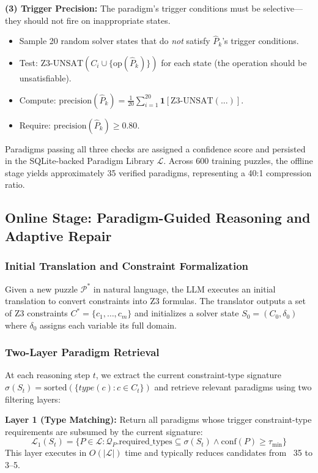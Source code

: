 \textbf{(3) Trigger Precision:} The paradigm's trigger conditions must be selective—they should not fire on inappropriate states.
\begin{itemize}
    \item Sample 20 random solver states that do \textit{not} satisfy $\hat{P}_k$'s trigger conditions.
    \item Test: $\text{Z3-UNSAT}(C_i \cup \{\text{op}(\hat{P}_k)\})$ for each state (the operation should be unsatisfiable).
    \item Compute: $\text{precision}(\hat{P}_k) = \frac{1}{20}\sum_{i=1}^{20} \mathbf{1}[\text{Z3-UNSAT}(...)]$.
    \item Require: $\text{precision}(\hat{P}_k) \geq 0.80$.
\end{itemize}

Paradigms passing all three checks are assigned a confidence score and persisted in the SQLite-backed Paradigm Library $\mathcal{L}$. Across 600 training puzzles, the offline stage yields approximately 35 verified paradigms, representing a 40:1 compression ratio.

\subsection{Online Stage: Paradigm-Guided Reasoning and Adaptive Repair}

\subsubsection{Initial Translation and Constraint Formalization}

Given a new puzzle $\mathcal{P}^*$ in natural language, the LLM executes an initial translation to convert constraints into Z3 formulas. The translator outputs a set of Z3 constraints $C^* = \{c_1, \ldots, c_m\}$ and initializes a solver state $S_0 = (C_0, \delta_0)$ where $\delta_0$ assigns each variable its full domain.

\subsubsection{Two-Layer Paradigm Retrieval}

At each reasoning step $t$, we extract the current constraint-type signature $\sigma(S_t) = \text{sorted}(\{type(c) : c \in C_t\})$ and retrieve relevant paradigms using two filtering layers:

\textbf{Layer 1 (Type Matching):} Return all paradigms whose trigger constraint-type requirements are subsumed by the current signature:
\[
\mathcal{L}_1(S_t) = \{P \in \mathcal{L} : \mathcal{Q}_P.\text{required\_types} \subseteq \sigma(S_t) \land \text{conf}(P) \geq \tau_{\min}\}
\]
This layer executes in $O(|\mathcal{L}|)$ time and typically reduces candidates from ~35 to 3--5.

